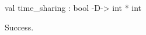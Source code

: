 \chklistingtrue
{}
\begin{ChkListingMsg}
val time_sharing : bool -D-> int * int 
\end{ChkListingMsg}
\begin{ChkListingErr}
Success.
\end{ChkListingErr}
